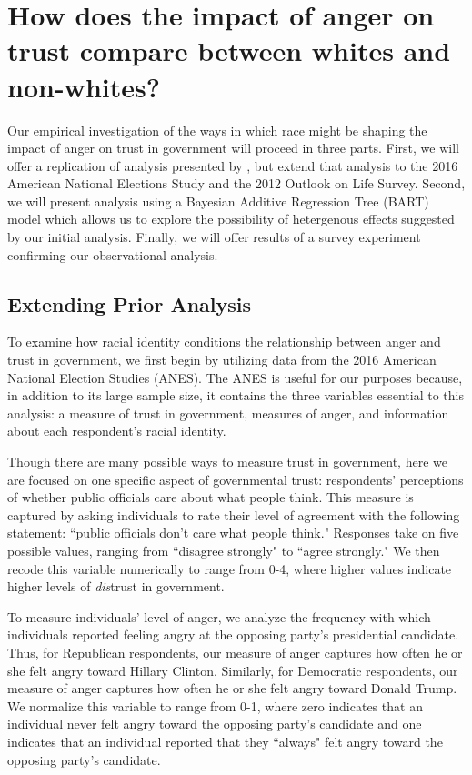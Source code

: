 \documentclass[12t, letterpaper]{article}
\begin{document}
\section{How does the impact of anger on trust compare between whites and non-whites?}
\label{sec:design}

Our empirical investigation of the ways in which race might be shaping the impact of anger on trust in government will proceed in three parts. First, we will offer a replication of analysis presented by \citet{webster2017}, but extend that analysis to the 2016 American National Elections Study and the 2012 Outlook on Life Survey. Second, we will present analysis using a  Bayesian Additive Regression Tree (BART) model which allows us to explore the possibility of hetergenous effects suggested by our initial analysis. Finally, we will offer results of a survey experiment confirming our observational analysis.

\subsection{Extending Prior Analysis}
\label{subsec:anes}

To examine how racial identity conditions the relationship between anger and trust in government, we first begin by utilizing data from the 2016 American National Election Studies (ANES). The ANES is useful for our purposes because, in addition to its large sample size, it contains the three variables essential to this analysis: a measure of trust in government, measures of anger, and information about each respondent's racial identity.

Though there are many possible ways to measure trust in government, here we are focused on one specific aspect of governmental trust: respondents' perceptions of whether public officials care about what people think. This measure is captured by asking individuals to rate their level of agreement with the following statement: ``public officials don't care what people think." Responses take on five possible values, ranging from ``disagree strongly" to ``agree strongly." We then recode this variable numerically to range from 0-4, where higher values indicate higher levels of \emph{dis}trust in government.

To measure individuals' level of anger, we analyze the frequency with which individuals reported feeling angry at the opposing party's presidential candidate. Thus, for Republican respondents, our measure of anger captures how often he or she felt angry toward Hillary Clinton. Similarly, for Democratic respondents, our measure of anger captures how often he or she felt angry toward Donald Trump. We normalize this variable to range from 0-1, where zero indicates that an individual never felt angry toward the opposing party's candidate and one indicates that an individual reported that they ``always" felt angry toward the opposing party's candidate. 
\end{document}
